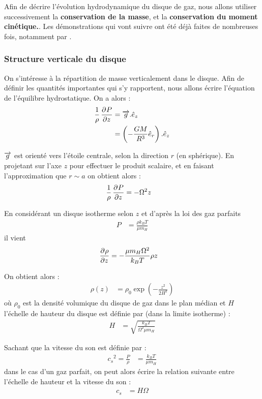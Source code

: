 \bigskip

Afin de décrire l'évolution hydrodynamique du disque de gaz, nous allons utiliser successivement la \textbf{conservation de la masse}, et la \textbf{conservation du moment cinétique.}. Les démonstrations qui vont suivre ont été déjà faites de nombreuses fois, notamment par \citep{pringle1981accretion}.

\subsubsection{Structure verticale du disque}
On s'intéresse à la répartition de masse verticalement dans le disque. Afin de définir les quantités importantes qui s'y rapportent, nous allons écrire l'équation de l'équilibre hydrostatique. On a alors :
\begin{align}
\frac{1}{\rho}\mathinner{ \dfrac{\partial{^{}}P}{\partial{{z}^{}}} } &= {\overrightarrow{g}}.\hat{e}_z\\
&= \left(-\frac{GM}{R^3}\hat{e}_r\right).\hat{e}_z
\end{align}

${\overrightarrow{g}}$ est orienté vers l'étoile centrale, selon la direction $r$ (en sphérique). En projetant sur l'axe $z$ pour effectuer le produit scalaire, et en faisant l'approximation que $r\sim a$ on obtient alors :
\begin{align}
\frac{1}{\rho}\mathinner{ \dfrac{\partial{^{}}P}{\partial{{z}^{}}} } &= -\Omega^2 z
\end{align}

En considérant un disque isotherme selon $z$ et d'après la loi des gaz parfaits
\begin{align}
P &= \frac{\rho k_B T}{\mu m_H}
\end{align}
il vient
\begin{align}
\mathinner{ \dfrac{\partial{^{}}\rho}{\partial{{z}^{}}} } &= -\frac{\mu m_H\Omega^2}{k_B T}\rho z
\end{align}

On obtient alors :
\begin{align}
\rho(z) &= \rho_0\exp\left(-\frac{z^2}{2H^2}\right)
\end{align}
où $\rho_0$ est la densité volumique du disque de gaz dans le plan médian et $H$ l'échelle de hauteur du disque est définie par (dans la limite isotherme) : 
\begin{align}
H &= \sqrt{\frac{k_B T}{\Omega^2 \mu m_H}}
\end{align}

\bigskip

Sachant que la vitesse du son est définie par :
\begin{align}
{c_s}^2=\frac{P}{\rho} &= \frac{k_B T}{\mu m_H}
\end{align}
dans le cas d'un gaz parfait, on peut alors écrire la relation suivante entre l'échelle de hauteur et la vitesse du son : 
\begin{align}
c_s &= H\Omega
\end{align}


